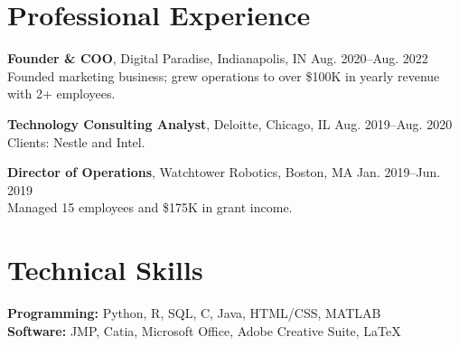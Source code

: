 \documentclass[11pt]{article}
\begin{document}
\section*{Professional Experience}

\noindent\textbf{Founder \& COO}, Digital Paradise, Indianapolis, IN \hfill Aug. 2020--Aug. 2022\\
Founded marketing business; grew operations to over \$100K in yearly revenue with 2+ employees.

\vspace{6pt}
\noindent\textbf{Technology Consulting Analyst}, Deloitte, Chicago, IL \hfill Aug. 2019--Aug. 2020\\
Clients: Nestle and Intel.

\vspace{6pt}
\noindent\textbf{Director of Operations}, Watchtower Robotics, Boston, MA \hfill Jan. 2019--Jun. 2019\\
Managed 15 employees and \$175K in grant income.

\section*{Technical Skills}

\noindent\textbf{Programming:} Python, R, SQL, C, Java, HTML/CSS, MATLAB \\
\textbf{Software:} JMP, Catia, Microsoft Office, Adobe Creative Suite, \LaTeX
\end{document}

